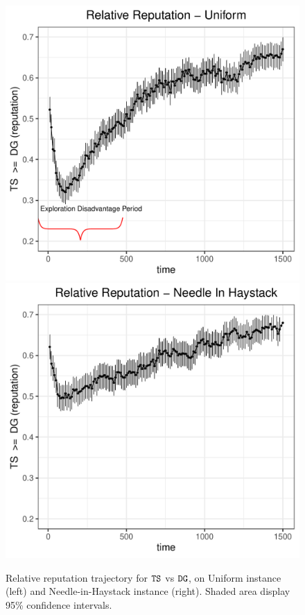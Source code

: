 \documentclass[../competing_bandits.tex]{subfiles}
\begin{document}
\begin{figure}[ht]
\centering
\includegraphics[scale=0.35]{ec19paper/figures/relative_uniform_annotated_plot}
\includegraphics[scale=0.35]{ec19paper/figures/relative_nih_ts_dg}
\caption{Relative reputation trajectory for $\mathtt{TS}$ vs $\mathtt{DG}$, on Uniform instance (left) and Needle-in-Haystack instance (right). Shaded area display 95\% confidence intervals.}
\label{relative_rep_plots}
\end{figure}
\end{document}
